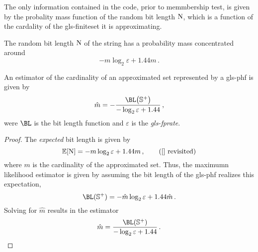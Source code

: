 \documentclass[ ../main.tex]{subfiles}
\begin{document}
The only information contained in the code, prior to memmbership test, is given by the probality mass function of the random bit length $\mathrm{N}$, which is a function of the cardality of the \gls{gls-finiteset} it is approximating.

The random bit length $\mathrm{N}$ of the string has a probability mass concentrated around
\begin{equation}
    -m \log_2 \varepsilon + 1.44 m\,.
\end{equation}


\begin{theorem}
An estimator of the cardinality of an approximated set represented by a \gls{gls-phf} is given by
\begin{equation}
    \hat{m} = -\frac{\BL\!\left(\Sp\right)}{-\log_2 \varepsilon + 1.44}\,,
\end{equation}
were $\BL$ is the bit length function and $\varepsilon$ is the \emph{\gls{gls-fprate}}.
\end{theorem}
\begin{proof}
The \emph{expected} bit length is given by
\begin{equation*}
    \expectation[\rv{N}] = -m \log_2 \varepsilon + 1.44 m\,, 
    \tag{\ref{} revisited}
\end{equation*}
where $m$ is the cardinality of the approximated set. Thus, the maximumn likelihood estimator is given by assuming the bit length of the \gls{gls-phf} realizes this expectation,
\begin{equation}
    \BL(\Sp) = -\hat{m} \log_2 \varepsilon + 1.44 \hat{m}\,.
\end{equation}
Solving for $\hat{m}$ results in the estimator
\begin{equation}
    \hat{m} = \frac{\BL(\Sp)}{-\log_2 \varepsilon + 1.44}\,.
\end{equation}
\end{proof}
\end{document}
